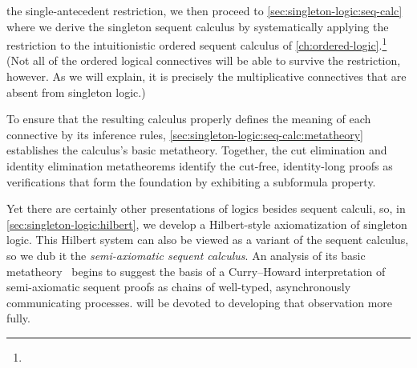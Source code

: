  the single-antecedent restriction, we then proceed to \cref{sec:singleton-logic:seq-calc} where we derive the singleton sequent calculus by systematically applying the restriction to the intuitionistic ordered sequent calculus of \cref{ch:ordered-logic}.\footnote[][-\baselineskip]{}
(Not all of the ordered logical connectives will be able to survive the restriction, however.
As we will explain, it is precisely the multiplicative connectives that are absent from singleton logic.)

To ensure that the resulting calculus properly defines the meaning of each connective by its inference rules, \cref{sec:singleton-logic:seq-calc:metatheory} establishes the calculus's basic metatheory.
Together, the cut elimination and identity elimination metatheorems identify the cut-free, identity-long proofs as verifications that form the foundation by exhibiting a subformula property.


Yet there are certainly other presentations of logics besides sequent calculi, so, in \cref{sec:singleton-logic:hilbert}, we develop a Hilbert-style axiomatization of singleton logic.
This Hilbert system can also be viewed as a variant of the sequent calculus, so we dub it the \emph{semi-axiomatic sequent calculus}\autocite{DeYoung+:FSCD20}.
An analysis of its basic metatheory~ begins to suggest the basis of a Curry--Howard interpretation of semi-axiomatic sequent proofs as chains of well-typed, asynchronously communicating processes.
 will be devoted to developing that observation more fully.



